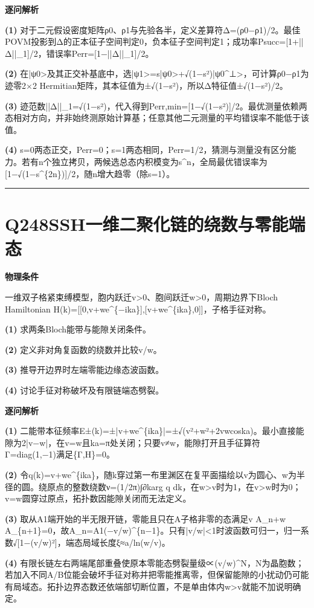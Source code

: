 \documentclass[UTF8,a4paper,11pt,oneside,openany]{ctexbook}
\begin{document}
\par\medskip\noindent\textbf{逐问解析}
\par\noindent\textbf{(1)} 对于二元假设密度矩阵ρ0、ρ1与先验各半，定义差算符Δ=(ρ0−ρ1)/2。最佳POVM投影到Δ的正本征子空间判定0，负本征子空间判定1；成功率Psucc=[1+||Δ||\_1]/2，错误率Perr=[1−||Δ||\_1]/2。
\par\noindent\textbf{(2)} 在|ψ0>及其正交补基底中，选|ψ1>=s|ψ0>+√(1−s²)|ψ0\textasciicircum{}⊥>，可计算ρ0−ρ1为迹零2×2 Hermitian矩阵，其本征值为±√(1−s²)，所以Δ特征值±√(1−s²)/2。
\par\noindent\textbf{(3)} 迹范数||Δ||\_1=√(1−s²)，代入得到Perr,min=[1−√(1−s²)]/2。最优测量依赖两态相对方向，并非始终测原始计算基；任意其他二元测量的平均错误率不能低于该值。
\par\noindent\textbf{(4)} s=0两态正交，Perr=0；s=1两态相同，Perr=1/2，猜测与测量没有区分能力。若有n个独立拷贝，两候选总态内积模变为s\textasciicircum{}n，全局最优错误率为[1−√(1−s\textasciicircum{}\{2n\})]/2，随n增大趋零（除s=1）。

\par\bigskip\hrule\bigskip
\section*{Q248\quad SSH一维二聚化链的绕数与零能端态}
\textbf{物理条件}\par 一维双子格紧束缚模型，胞内跃迁v>0、胞间跃迁w>0，周期边界下Bloch Hamiltonian H(k)=[[0,v+we\textasciicircum{}\{−ika\}],[v+we\textasciicircum{}\{ika\},0]]，子格手征对称。
\par\noindent\textbf{(1)} 求两条Bloch能带与能隙关闭条件。
\par\noindent\textbf{(2)} 定义非对角复函数的绕数并比较v/w。
\par\noindent\textbf{(3)} 推导开边界时左端零能边缘态波函数。
\par\noindent\textbf{(4)} 讨论手征对称破坏及有限链端态劈裂。

\par\medskip\noindent\textbf{逐问解析}
\par\noindent\textbf{(1)} 二能带本征频率E±(k)=±|v+we\textasciicircum{}\{ika\}|=±√(v²+w²+2vwcoska)。最小直接能隙为2|v−w|，在v=w且ka=π处关闭；只要v≠w，能隙打开且手征算符Γ=diag(1,−1)满足\{Γ,H\}=0。
\par\noindent\textbf{(2)} 令q(k)=v+we\textasciicircum{}\{ika\}，随k穿过第一布里渊区在复平面描绘以v为圆心、w为半径的圆。绕原点的整数绕数ν=(1/2π)∫∂karg q dk，在w>v时为1，在v>w时为0；v=w圆穿过原点，拓扑数因能隙关闭而无法定义。
\par\noindent\textbf{(3)} 取从A1端开始的半无限开链，零能且只在A子格非零的态满足v A\_n+w A\_\{n+1\}=0，故A\_n=A1(−v/w)\textasciicircum{}\{n−1\}。只有|v/w|<1时波函数可归一，归一系数√[1−(v/w)²]，端态局域长度ξ≈a/ln(w/v)。
\par\noindent\textbf{(4)} 有限长链左右两端尾部重叠使原本零能态劈裂量级∝(v/w)\textasciicircum{}N，N为晶胞数；若加入不同A/B位能会破坏手征对称并把零能推离零，但保留能隙的小扰动仍可能有局域态。拓扑边界态数还依端部切断位置，不是单由体内w>v就能不加说明确定。
\end{document}
